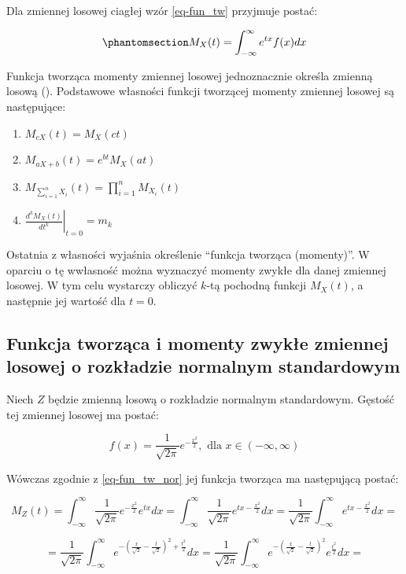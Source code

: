 \documentclass[
  letterpaper,
  DIV=11,
  numbers=noendperiod]{scrreprt}
\begin{document}
Dla zmiennej losowej ciagłej wzór \ref{eq-fun_tw} przyjmuje postać:

\begin{equation}\phantomsection\label{eq-fun_cg}{M_X(t)  = \int_{-\infty}^{\infty}e^{tx}f(x) dx}\end{equation}

Funkcja tworząca momenty zmiennej losowej jednoznacznie określa zmienną
losową (). Podstawowe własności funkcji tworzącej momenty zmiennej
losowej są następujące:

\begin{enumerate}
\def\labelenumi{\arabic{enumi}.}
\item
  \(M_{cX}(t)= M_X(ct)\)
\item
  \(M_{aX+b}(t)= e^{bt}M_X(at)\)
\item
  \(M_{\sum_{i=1}^{n} X_i} (t)= \prod_{i=1}^{n} M_{X_i}(t)\)
\item
  \(\left. \frac{d^k M_X(t)}{dt^k} \right|_{t=0} = m_k\)
\end{enumerate}

Ostatnia z własności wyjaśnia określenie ``funkcja tworząca (momenty)''.
W oparciu o tę wwłasność można wyznaczyć momenty zwykłe dla danej
zmiennej losowej. W tym celu wystarczy obliczyć \(k\)-tą pochodną
funkcji \(M_X(t)\), a następnie jej wartość dla \(t=0\).

\subsection{Funkcja tworząca i momenty zwykłe zmiennej losowej o
rozkładzie normalnym
standardowym}\label{funkcja-tworzux105ca-i-momenty-zwykux142e-zmiennej-losowej-o-rozkux142adzie-normalnym-standardowym}

Niech \(Z\) będzie zmienną losową o rozkładzie normalnym standardowym.
Gęstość tej zmiennej losowej ma postać:

\[f(x)= \frac{1}{\sqrt{2\pi}}e^{-\frac{x^2}{2}}, \text{ dla } x \in (-\infty, \infty)\]

Wówczas zgodnie z \ref{eq-fun_tw_nor} jej funkcja tworząca ma
następującą postać:

\[M_Z(t) = \int_{-\infty}^{\infty}\frac{1}{\sqrt{2\pi}}e^{-\frac{x^2}{2}}e^{tx}dx=\int_{-\infty}^{\infty}\frac{1}{\sqrt{2\pi}}e^{tx-\frac{x^2}{2}}dx=\frac{1}{\sqrt{2\pi}}\int_{-\infty}^{\infty}e^{tx-\frac{x^2}{2}}dx=\]

\[=\frac{1}{\sqrt{2\pi}}\int_{-\infty}^{\infty}e^{-(\frac{x}{\sqrt{2}}-\frac{t}{\sqrt{2}})^2+\frac{t^2}{2}}dx=\frac{1}{\sqrt{2\pi}}\int_{-\infty}^{\infty} e^{-(\frac{x}{\sqrt{2}}-\frac{t}{\sqrt{2}})^2 } e^{\frac{t^2}{2}}dx=\]
\end{document}
